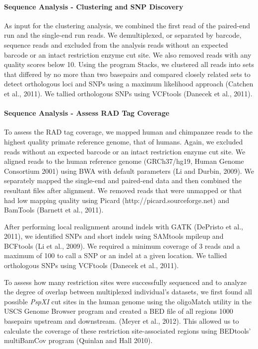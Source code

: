 \documentclass[12pt]{article}
\begin{document}
\paragraph{Sequence Analysis - Clustering and SNP Discovery}

As input for the clustering analysis, we combined the first read of the paired-end run and the single-end run reads. We demultiplexed, or separated by barcode, sequence reads and excluded from the analysis reads without an expected barcode or an intact restriction enzyme cut site. We also removed reads with any quality scores below 10. Using the program Stacks, we clustered all reads into sets that differed by no more than two basepairs and compared closely related sets to detect orthologous loci and SNPs using a maximum likelihood approach (Catchen et al., 2011). We tallied orthologous SNPs using VCFtools (Danecek et al., 2011).

\paragraph{Sequence Analysis - Assess RAD Tag Coverage}

To assess the RAD tag coverage, we mapped human and chimpanzee reads to the highest quality primate reference genome, that of humans. Again, we excluded reads without an expected barcode or an intact restriction enzyme cut site. We aligned reads to the human reference genome (GRCh37/hg19, Human Genome Consortium 2001) using BWA with default parameters (Li and Durbin, 2009). We separately mapped the single-end and paired-end data and then combined the resultant files after alignment. We removed reads that were unmapped or that had low mapping quality using Picard (http://picard.sourceforge.net) and BamTools (Barnett et al., 2011). 

After performing local realignment around indels with GATK (DePristo et al., 2011), we identified SNPs and short indels using SAMtools mpileup and BCFtools (Li et al., 2009). We required a minimum coverage of 3 reads and a maximum of 100 to call a SNP or an indel at a given location. We tallied orthologous SNPs using VCFtools (Danecek et al., 2011).
	
To assess how many restriction sites were successfully sequenced and to analyze the degree of overlap between multiplexed individual's datasets, we first found all possible \emph{PspXI} cut sites in the human genome using the oligoMatch utility in the USCS Genome Browser program and created a BED file of all regions 1000 basepairs upstream and downstream. (Meyer et al., 2012). This allowed us to calculate the coverage of these restriction site-associated regions using BEDtools' multiBamCov program (Quinlan and Hall 2010).
\end{document}

